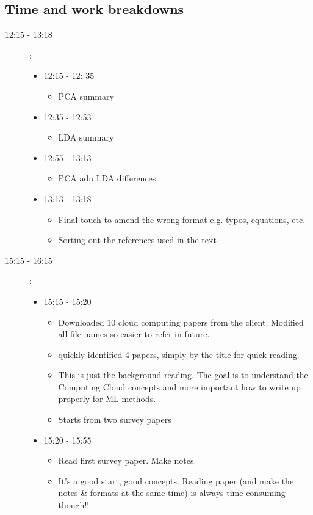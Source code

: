 \documentclass[a4paper]{article}
\begin{document}
\subsection{Time and work breakdowns}
\begin{description}
	\item [12:15 - 13:18]:
	\begin{itemize}
		\item 12:15 - 12: 35
			\begin{itemize}
				\item PCA summary				
			\end{itemize}
		\item 12:35 - 12:53
			\begin{itemize}
				\item LDA summary
			\end{itemize}
		\item 12:55 - 13:13
			\begin{itemize}
				\item PCA adn LDA differences
			\end{itemize}
		\item 13:13 - 13:18
			\begin{itemize}
				\item Final touch to amend the wrong format e.g. typos, equations, etc.
				\item Sorting out the references used in the text
			\end{itemize}
	\end{itemize}
	
	\item[15:15 - 16:15]:
	\begin{itemize}
		\item 15:15 - 15:20
			\begin{itemize}
				\item Downloaded 10 cloud computing papers from the client. Modified all file names so easier to refer in future.
				\item quickly identified 4 papers, simply by the title for quick reading.
				\item This is just the background reading. The goal is to understand the Computing Cloud concepts and more important how to write up properly for ML methods.
				\item Starts from two survey papers
			\end{itemize}
		\item 15:20 - 15:55
		\begin{itemize}
			\item Read first survey paper. Make notes.
			\item It's a good start, good concepts. Reading paper (and make the notes \& formats at the same time) is always time consuming though!!
		\end{itemize} 
		 
	\end{itemize}
\end{description}
\end{document}
